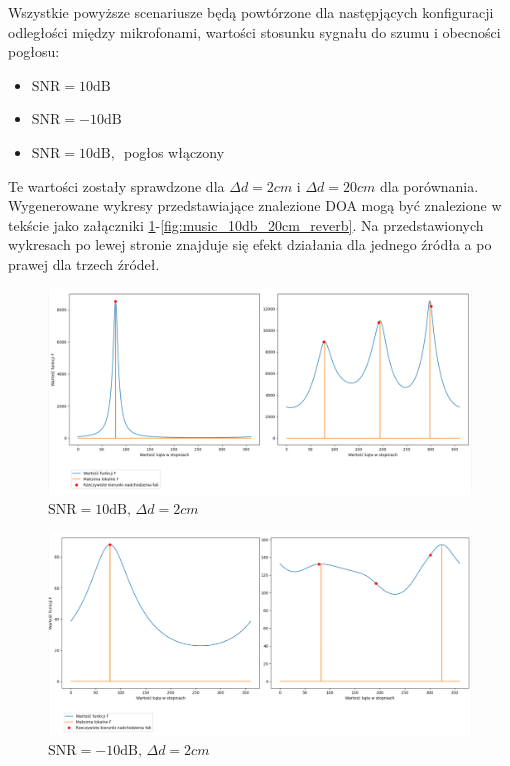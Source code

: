 \noindent Wszystkie powyższe scenariusze będą powtórzone dla następjących konfiguracji odległości między mikrofonami, wartości stosunku sygnału do szumu i obecności pogłosu:

\begin{itemize}
    \item $\mathrm{SNR}=10\mathrm{dB}$ 
    \item $\mathrm{SNR}=-10\mathrm{dB}$
    \item $\mathrm{SNR}=10\mathrm{dB}, \, $ pogłos włączony
\end{itemize}

\noindent Te wartości zostały sprawdzone dla $\Delta d = 2cm$ i $\Delta d = 20cm$ dla porównania. Wygenerowane wykresy przedstawiające znalezione DOA mogą być znalezione w tekście jako załączniki \ref{fig:music_10db_2cm}-\ref{fig:music_10db_20cm_reverb}. Na przedstawionych wykresach po lewej stronie znajduje się efekt działania dla jednego źródła a po prawej dla trzech źródeł.

\begin{figure}[h!]
    \centering
    \includegraphics[width=\textwidth]{Images/music_10db.png}
    \caption{$\mathrm{SNR}=10\mathrm{dB}, \, \Delta d = 2cm$}
    \label{fig:music_10db_2cm}
\end{figure}

\begin{figure}[h!]
    \centering
    \includegraphics[width=\textwidth]{Images/music_-10db.png}
    \caption{$\mathrm{SNR}=-10\mathrm{dB}, \, \Delta d = 2cm$}
    \label{fig:music_-10db_2cm}
\end{figure}

